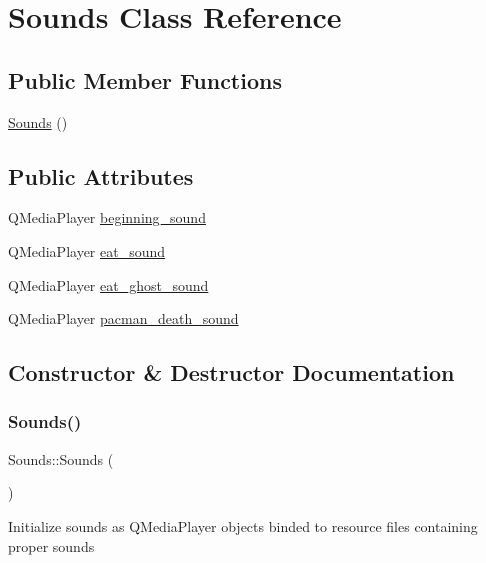 \hypertarget{class_sounds}{}\section{Sounds Class Reference}
\label{class_sounds}
\subsection*{Public Member Functions}
\begin{DoxyCompactItemize}
\item 
\mbox{\hyperlink{class_sounds_ab5cf288a278469c4d821a3ae33c39d37}{Sounds}} ()
\end{DoxyCompactItemize}
\subsection*{Public Attributes}
\begin{DoxyCompactItemize}
\item 
Q\+Media\+Player \mbox{\hyperlink{class_sounds_aa79b0142330a03976c36fe5c49a66c54}{beginning\+\_\+sound}}
\item 
Q\+Media\+Player \mbox{\hyperlink{class_sounds_a9821fc886ba3bfb8404bf9fee86ddfbe}{eat\+\_\+sound}}
\item 
Q\+Media\+Player \mbox{\hyperlink{class_sounds_a3c9fdf7f2d77cb9e9f4203e2e1a489f6}{eat\+\_\+ghost\+\_\+sound}}
\item 
Q\+Media\+Player \mbox{\hyperlink{class_sounds_a8c8a27c32ae161a18da0cc8c6df09e69}{pacman\+\_\+death\+\_\+sound}}
\end{DoxyCompactItemize}


\subsection{Constructor \& Destructor Documentation}
\mbox{\label{class_sounds_ab5cf288a278469c4d821a3ae33c39d37}} 
\subsubsection{\texorpdfstring{Sounds()}{Sounds()}}
{\footnotesize\ttfamily Sounds\+::\+Sounds (\begin{DoxyParamCaption}{ }\end{DoxyParamCaption})}

Initialize sounds as Q\+Media\+Player objects binded to resource files containing proper sounds 

